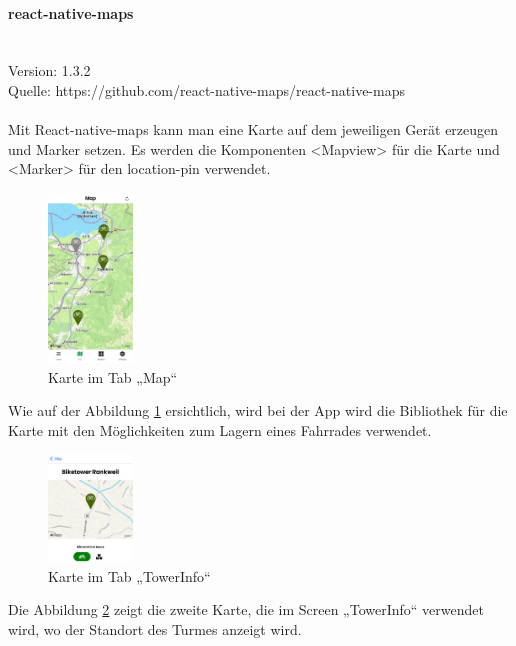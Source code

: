 \paragraph{react-native-maps}\mbox{}\\
Version: 1.3.2\\
Quelle: https://github.com/react-native-maps/react-native-maps\\ \\
Mit React-native-maps kann man eine Karte auf dem jeweiligen Gerät erzeugen und Marker setzen. Es werden die Komponenten <Mapview> für die Karte und <Marker> für den location-pin verwendet.  \\
\begin{figure}[H]
    \centering
    \includegraphics[width=0.2\textwidth]{images/app-screenshots/tabmap.jpg}
    \caption{Karte im Tab „Map“}
    \label{fig:tabmap}
\end{figure}
Wie auf der Abbildung \ref*{fig:tabmap} ersichtlich, wird bei der App wird die Bibliothek für die Karte mit den Möglichkeiten zum Lagern eines Fahrrades verwendet. \\ 
\begin{figure}[H]
    \centering
    \includegraphics[width=0.2\textwidth]{images/app-screenshots/smallmap.png}
    \caption{Karte im Tab „TowerInfo“}
    \label{fig:smallmap}
\end{figure}
Die Abbildung \ref{fig:smallmap} zeigt die zweite Karte, die im Screen „TowerInfo“ verwendet wird, wo der Standort des Turmes anzeigt wird.\\



